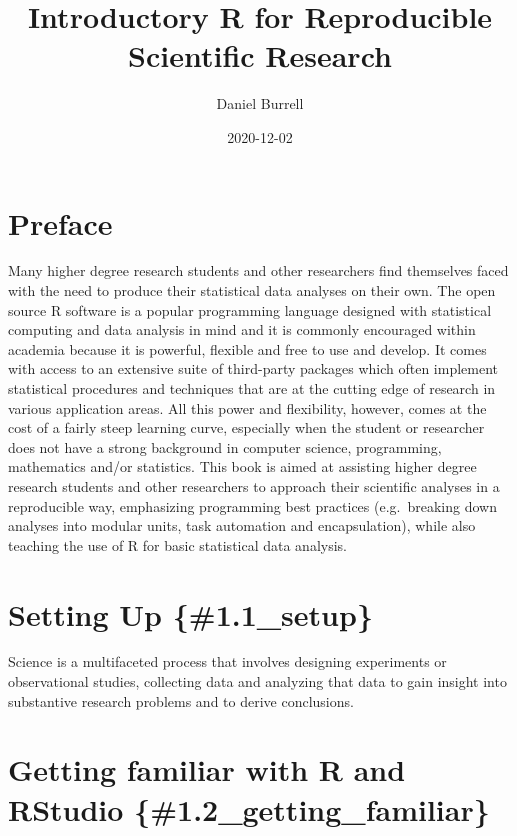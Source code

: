 \documentclass[
]{book}
\title{Introductory R for Reproducible Scientific Research}
\author{Daniel Burrell}
\date{2020-12-02}
\begin{document}
\maketitle

{
\setcounter{tocdepth}{1}
\tableofcontents
}
\hypertarget{preface}{%
\chapter{Preface}\label{preface}}

Many higher degree research students and other researchers find themselves faced with the need to produce their statistical data analyses on their own. The open source R software is a popular programming language designed with statistical computing and data analysis in mind and it is commonly encouraged within academia because it is powerful, flexible and free to use and develop. It comes with access to an extensive suite of third-party packages which often implement statistical procedures and techniques that are at the cutting edge of research in various application areas. All this power and flexibility, however, comes at the cost of a fairly steep learning curve, especially when the student or researcher does not have a strong background in computer science, programming, mathematics and/or statistics. This book is aimed at assisting higher degree research students and other researchers to approach their scientific analyses in a reproducible way, emphasizing programming best practices (e.g.~breaking down analyses into modular units, task automation and encapsulation), while also teaching the use of R for basic statistical data analysis.

\hypertarget{setting-up-1.1_setup}{%
\chapter{Setting Up \{\#1.1\_setup\}}\label{setting-up-1.1_setup}}

Science is a multifaceted process that involves designing experiments or observational studies, collecting data and analyzing that data to gain insight into substantive research problems and to derive conclusions.

\hypertarget{getting-familiar-with-r-and-rstudio-1.2_getting_familiar}{%
\chapter{Getting familiar with R and RStudio \{\#1.2\_getting\_familiar\}}\label{getting-familiar-with-r-and-rstudio-1.2_getting_familiar}}
\end{document}
